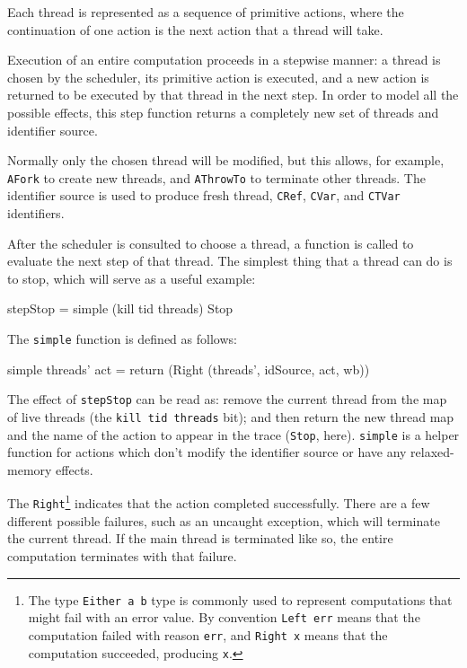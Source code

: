 Each thread is represented as a sequence of primitive actions, where
the continuation of one action is the next action that a thread will
take.

Execution of an entire computation proceeds in a stepwise manner: a
thread is chosen by the scheduler, its primitive action is executed,
and a new action is returned to be executed by that thread in the next
step. In order to model all the possible effects, this step function
returns a completely new set of threads and identifier source.

Normally only the chosen thread will be modified, but this allows, for
example, \verb|AFork| to create new threads, and \verb|AThrowTo| to
terminate other threads. The identifier source is used to produce
fresh thread, \verb|CRef|, \verb|CVar|, and \verb|CTVar| identifiers.

After the scheduler is consulted to choose a thread, a function is
called to evaluate the next step of that thread. The simplest thing
that a thread can do is to stop, which will serve as a useful
example:

\begin{haskellcode}
stepStop = simple (kill tid threads) Stop
\end{haskellcode}

The \verb|simple| function is defined as follows:

\begin{haskellcode}
simple threads' act =
  return (Right (threads', idSource, act, wb))
\end{haskellcode}

The effect of \verb|stepStop| can be read as: remove the current
thread from the map of live threads (the \verb|kill tid threads| bit);
and then return the new thread map and the name of the action to
appear in the trace (\verb|Stop|, here). \verb|simple| is a helper
function for actions which don't modify the identifier source or have
any relaxed-memory effects.

The \verb|Right|\footnote{The type \texttt{Either a b} type is
  commonly used to represent computations that might fail with an
  error value. By convention \texttt{Left err} means that the
  computation failed with reason \texttt{err}, and \texttt{Right x}
  means that the computation succeeded, producing \texttt{x}.}
indicates that the action completed successfully. There are a few
different possible failures, such as an uncaught exception, which will
terminate the current thread. If the main thread is terminated like
so, the entire computation terminates with that failure.

